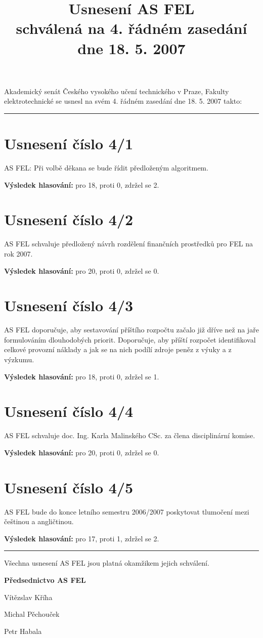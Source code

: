 \documentclass[a4paper,12pt,notitlepage]{article}
\title{Usnesení AS FEL\\schválená na 4. řádném zasedání dne 18. 5. 2007}
\author{}\date{}
\newcommand{\hr}{\bigskip\bigskip\hrule\bigskip\bigskip}
\newcommand{\usneseni}[5]{
\section*{#1}

#2

\textbf{Výsledek hlasování:} pro #3, proti #4, zdržel se #5.}
\begin{document}
\maketitle


Akademický senát Českého vysokého učení technického v Praze, Fakulty
elektrotechnické se usnesl na svém 4. řádném zasedání dne 18. 5. 2007 takto:\hr



\usneseni{Usnesení číslo 4/1}{AS FEL: Při volbě děkana se bude řídit předloženým algoritmem.}{18}{0}{2}

\usneseni{Usnesení číslo 4/2}{AS FEL schvaluje předložený návrh rozdělení finančních prostředků pro FEL na rok 2007.}{20}{0}{0}

\usneseni{Usnesení číslo 4/3}{AS FEL doporučuje, aby sestavování příštího rozpočtu začalo již dříve než na jaře formulováním dlouhodobých priorit. Doporučuje, aby příští rozpočet identifikoval celkové provozní náklady a jak se na nich podílí zdroje peněz z výuky a z výzkumu.}{18}{0}{1}

\usneseni{Usnesení číslo 4/4}{AS FEL schvaluje doc. Ing. Karla Malinského CSc. za člena disciplinární komise.}{20}{0}{0}

\usneseni{Usnesení číslo 4/5}{AS FEL bude do konce letního semestru 2006/2007 poskytovat tlumočení mezi češtinou a angličtinou.}{17}{1}{2}

\bigskip\bigskip\bigskip\bigskip\bigskip\bigskip\hr
Všechna usnesení AS FEL jsou platná okamžikem jejich schválení.
\bigskip\bigskip\bigskip


\begin{center}
\textbf{Předsednictvo AS FEL}

Vítězslav Kříha

Michal Pěchouček

Petr Habala
\end{center}
\end{document}
